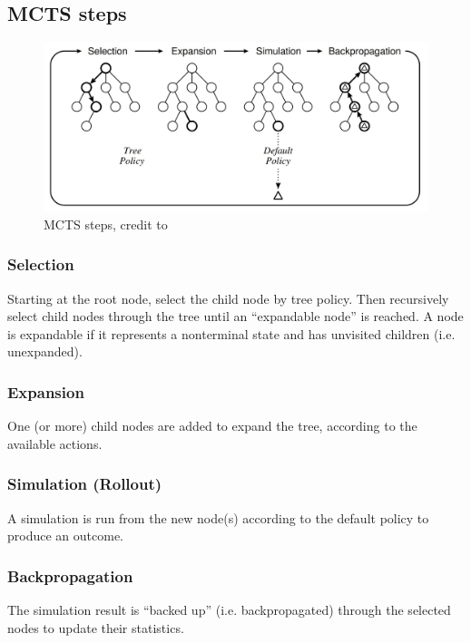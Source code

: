 \subsection{MCTS steps}

\begin{figure}
  \begin{center}
    \includegraphics[width=\textwidth]{images/mcts-steps.jpg}
  \end{center}
  \caption{MCTS steps, credit to \cite{mcts-survey}}
  \label{fig:mcts-steps}
\end{figure}

\subsubsection{Selection}
Starting at the root node, select the child node by tree policy. Then recursively select child nodes through the tree until an ``expandable node'' is reached. A node is expandable if it represents a nonterminal state and has unvisited children (i.e. unexpanded).

\subsubsection{Expansion}
One (or more) child nodes are added to expand the tree, according to the available actions.

\subsubsection{Simulation (Rollout)}
A simulation is run from the new node(s) according to the default policy to produce an outcome.
\subsubsection{Backpropagation}
The simulation result is ``backed up'' (i.e. backpropagated) through the selected nodes to update their statistics.

